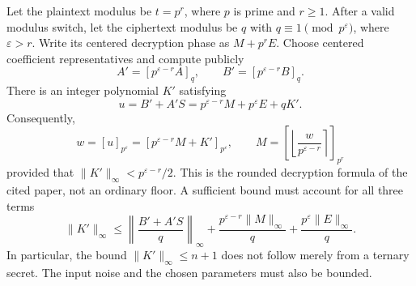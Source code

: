 Let the plaintext modulus be $t=p^r$, where $p$ is prime and $r\geq1$. After a valid modulus switch, let the ciphertext modulus be $q$ with $q\equiv1\pmod{p^\varepsilon}$, where $\varepsilon>r$. Write its centered decryption phase as $M+p^rE$. Choose centered coefficient representatives and compute publicly
\[
A'=[p^{\varepsilon-r}A]_q,\qquad B'=[p^{\varepsilon-r}B]_q.
\]
There is an integer polynomial $K'$ satisfying
\[
u=B'+A'S=p^{\varepsilon-r}M+p^\varepsilon E+qK'.
\]
Consequently,
\[
w=[u]_{p^\varepsilon}=[p^{\varepsilon-r}M+K']_{p^\varepsilon},\qquad
M=\left[\left\lfloor\frac{w}{p^{\varepsilon-r}}\right\rceil\right]_{p^r}
\]
provided that $\|K'\|_\infty<p^{\varepsilon-r}/2$. This is the rounded decryption formula of the cited paper, not an ordinary floor. A sufficient bound must account for all three terms
\[
\|K'\|_\infty\leq\left\|\frac{B'+A'S}{q}\right\|_\infty+
\frac{p^{\varepsilon-r}\|M\|_\infty}{q}+
\frac{p^\varepsilon\|E\|_\infty}{q}.
\]
In particular, the bound $\|K'\|_\infty\leq n+1$ does not follow merely from a ternary secret. The input noise and the chosen parameters must also be bounded.

